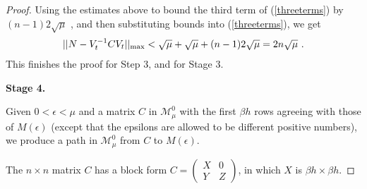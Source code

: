 \documentclass{amsart}
\theoremstyle{definition}
\theoremstyle{remark}
\numberwithin{equation}{section}
\begin{document}
{{\begin{proof}
Using the estimates above to bound the third term of 
(\ref{threeterms}) by $(n-1)2\sqrt{\mu}$ , and then substituting bounds 
into (\ref{threeterms}), we get 
\begin{align*} 
||N-V_t^{-1}CV_t ||_{\textnormal{max}}  
< \sqrt{\mu }
+ \sqrt{\mu }
+
 {(n-1)2\sqrt{\mu}}  = 2n\sqrt{\mu} \ .
\end{align*} 
This finishes the proof for Step 3, and for  
 Stage 3. 

{\bf Stage 4.} 

Given $0<\epsilon < \mu$ and 
a matrix $C$  in $\mathcal M^0_{\mu}$ 
with the first $\beta h$ rows agreeing with those of 
$M(\epsilon)$ (except that the epsilons are allowed to 
be different positive numbers), we produce a path in 
$\mathcal M^0_{\mu}$ from $C$ to $M(\epsilon)$. 

The $n\times n$ matrix $C$ has a block form 
$C= 
\left(\begin{smallmatrix} X & 0 \\ Y & Z 
\end{smallmatrix} \right)$, in which $X$ is $\beta h\times \beta h$. 


\end{proof}}}
\end{document}
